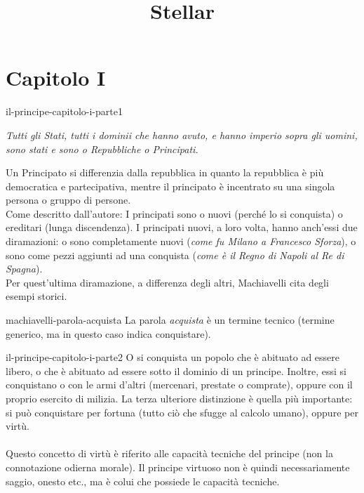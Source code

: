 \documentclass[preview]{standalone}
\begin{document}
\title{Stellar}
\genpage

\section{Capitolo I}

\begin{snippet}{il-principe-capitolo-i-parte1}
    \begin{center}
        \begin{minipage}{0.75\textwidth}
            \itshape
            Tutti gli Stati, tutti i dominii che hanno avuto, e hanno imperio sopra gli uomini, sono stati e sono o Repubbliche o Principati.
        \end{minipage}
    \end{center}
    \vspace{0.25cm}
    Un Principato si differenzia dalla repubblica in quanto la repubblica è più democratica e partecipativa,
    mentre il principato è incentrato su una singola persona o gruppo di persone. \\
    Come descritto dall'autore: I principati sono o nuovi (perché lo si conquista) o ereditari (lunga discendenza).
    I principati nuovi, a loro volta, hanno anch'essi due diramazioni:
    o sono completamente nuovi (\textit{come fu Milano a Francesco Sforza}),
    o sono come pezzi aggiunti ad una conquista
    (\textit{come è il Regno di Napoli al Re di Spagna}). \\
    Per quest'ultima diramazione, a differenza degli altri, Machiavelli cita degli esempi storici.
\end{snippet}

\begin{snippetnote}{machiavelli-parola-acquista}{}
    La parola \textit{acquista} è un termine tecnico (termine generico, ma in questo caso indica conquistare).
\end{snippetnote}

\begin{snippet}{il-principe-capitolo-i-parte2}
    O si conquista un popolo che è abituato ad essere libero, o che è abituato ad
    essere sotto il dominio di un principe.
    Inoltre, essi si conquistano o con le armi d'altri (mercenari, prestate o comprate),
    oppure con il proprio esercito di milizia.
    La terza ulteriore distinzione è quella più importante: si può conquistare per fortuna (tutto ciò che sfugge al calcolo umano),
    oppure per virtù.
    \\\\
    Questo concetto di virtù è riferito alle capacità tecniche del principe (non la connotazione odierna morale).
    Il principe virtuoso non è quindi necessariamente saggio, onesto etc., ma è colui che
    possiede le capacità tecniche.
\end{snippet}
\end{document}
